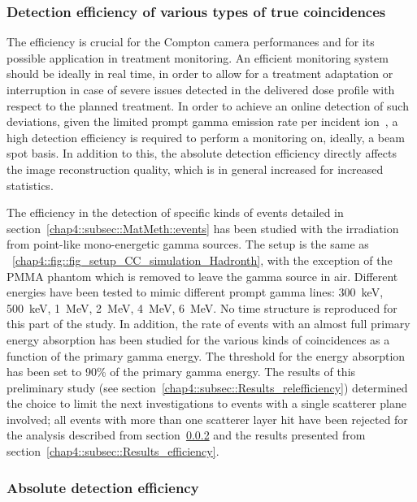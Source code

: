 \subsubsection{Detection efficiency of various types of true coincidences}\label{chap4::subsubsec::relEff}
The efficiency is crucial for the Compton camera performances and for its possible application in treatment monitoring. An efficient monitoring system should be ideally in real time, in order to allow for a treatment adaptation or interruption in case of severe issues detected in the delivered dose profile with respect to the planned treatment. In order to achieve an online detection of such deviations, given the limited prompt gamma emission rate per incident ion~\parencite{Ortega2015}, a high detection efficiency is required to perform a monitoring on, ideally, a beam spot basis. In addition to this, the absolute detection efficiency directly affects the image reconstruction quality, which is in general increased for increased statistics.

The efficiency in the detection of specific kinds of events detailed in section~\ref{chap4::subsec::MatMeth::events} has been studied with the irradiation from point-like mono-energetic gamma sources. The setup is the same as \figurename~\ref{chap4::fig::fig_setup_CC_simulation_Hadronth}, with the exception of the PMMA phantom which is removed to leave the gamma source in air. Different energies have been tested to mimic different prompt gamma lines: 300~keV, 500~keV, 1~MeV, 2~MeV, 4~MeV, 6~MeV. No time structure is reproduced for this part of the study.
In addition, the rate of events with an almost full primary energy absorption has been studied for the various kinds of coincidences as a function of the primary gamma energy. The threshold for the energy absorption has been set to 90\% of the primary gamma energy. 
The results of this preliminary study (see section~\ref{chap4::subsec::Results_relefficiency}) determined the choice to limit the next investigations to events with a single scatterer plane involved; all events with more than one scatterer layer hit have been rejected for the analysis described from section~\ref{chap4::subsubsec::absEff} and the results presented from section~\ref{chap4::subsec::Results_efficiency}.

\subsubsection{Absolute detection efficiency}\label{chap4::subsubsec::absEff}

